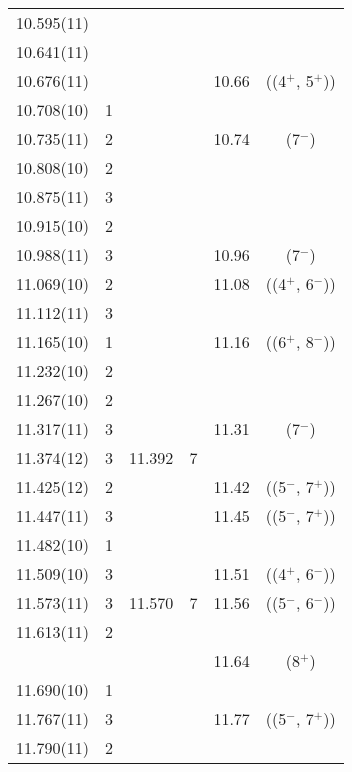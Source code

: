 \begin{center}
\begin{longtable}{cc cc cc}
  10.595(11)    &   &   &   &   &                         \\
     10.641(11)   &   &   &   &   &                         \\
     10.676(11)   &   &   &   & 10.66 & ((4$^+$, 5$^+$))        \\
     10.708(10)   & 1 &   &   &   &                         \\
     10.735(11)   & 2 &   &   & 10.74 & (7$^-$)                 \\
     10.808(10)   & 2 &   &   &   &   \\
     10.875(11)   & 3 &   &   &   &   \\
     10.915(10)   & 2 &   &   &   &   \\
   10.988(11)     & 3 &   &   & 10.96 & (7$^-$)                   \\
    11.069(10)    & 2 &   &   & 11.08 & ((4$^+$, 6$^-$))          \\
     11.112(11)   & 3 &   &   &   &                           \\
    11.165(10)    & 1 &   &   & 11.16 & ((6$^+$, 8$^-$))          \\
    11.232(10)    & 2 &   &   &   &                           \\
    11.267(10)    & 2 &   &   &   &                           \\
    11.317(11)    & 3 &   &   & 11.31 & (7$^-$)                   \\
    11.374(12)    & 3 & 11.392  & 7 &   &                           \\
    11.425(12)    & 2 &   &   & 11.42 & ((5$^-$, 7$^+$))          \\
    11.447(11)    & 3 &   &   & 11.45 & ((5$^-$, 7$^+$))      \\
    11.482(10)    & 1 &   &   &   &                           \\
    11.509(10)    & 3 &   &   & 11.51 & ((4$^+$, 6$^-$))          \\
     11.573(11)   & 3 & 11.570  & 7 & 11.56 & ((5$^-$, 6$^-$))          \\
     11.613(11)   & 2 &   &   &   &                           \\
  &   &   &   & 11.64 & (8$^+$)                   \\
   11.690(10)     & 1 &   &   &   &                           \\
   11.767(11)     & 3 &   &   & 11.77 & ((5$^-$, 7$^+$))          \\
   11.790(11)     & 2 &   &   &   &                           \\

\end{longtable}
\end{center}
